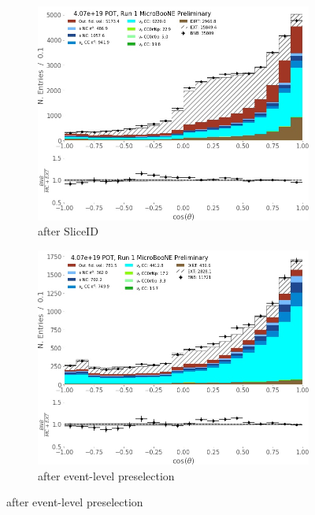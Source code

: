 \begin{figure}[H] 
\begin{center}
    \begin{subfigure}[b]{0.3\textwidth}
    \centering
    \includegraphics[width=1.00\textwidth]{NuMuCCsel/Images/Ryan/Run1_costheta_sliceID.jpg}
    \caption{\label{fig:NuMUCCsel:ryan:trklenSliceID} after SliceID}
    \end{subfigure}
    \begin{subfigure}[b]{0.3\textwidth}
    \centering
    \includegraphics[width=1.00\textwidth]{NuMuCCsel/Images/Ryan/Run1_costheta_evtsel.jpg}
    \caption{\label{fig:NuMUCCsel:ryan:trklenEvt} after event-level preselection}

\end{subfigure}
\end{center}
\end{figure}
